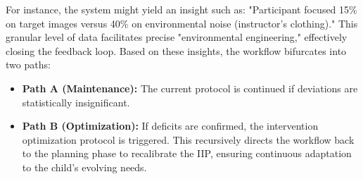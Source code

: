 For instance, the system might yield an insight such as: "Participant focused 15\% on target images versus 40\% on environmental noise (instructor's clothing)." This granular level of data facilitates precise "environmental engineering," effectively closing the feedback loop. Based on these insights, the workflow bifurcates into two paths:
\begin{itemize}
    \item \textbf{Path A (Maintenance):} The current protocol is continued if deviations are statistically insignificant.
    \item \textbf{Path B (Optimization):} If deficits are confirmed, the intervention optimization protocol is triggered. This recursively directs the workflow back to the planning phase to recalibrate the IIP, ensuring continuous adaptation to the child's evolving needs.
\end{itemize}










